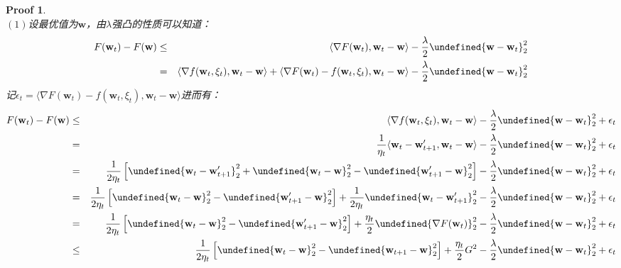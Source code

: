 \documentclass[a4paper,UTF8]{article}
\let\norm\undefined %
\DeclarePairedDelimiter\norm{\lVert}{\rVert}
\numberwithin{equation}{section}
\newtheorem*{myProof}{Proof}
\begin{document}
\begin{myProof}~\\
$(1)$设最优值为$\mathbf{w}$，由$\lambda$强凸的性质可以知道：
\begin{eqnarray*}
F(\mathbf{w}_t) - F(\mathbf{w}) &\le& \langle \nabla F(\mathbf{w}_t), \mathbf{w}_t - \mathbf{w} \rangle - \frac{\lambda}{2} \norm{\mathbf{w} - \mathbf{w}_t}_2^2 \\
&=& \langle \nabla f(\mathbf{w}_t, \xi_t), \mathbf{w}_t - \mathbf{w} \rangle + \langle \nabla F(\mathbf{w}_t) - f(\mathbf{w}_t, \xi_t) , \mathbf{w}_t - \mathbf{w} \rangle  - \frac{\lambda}{2} \norm{\mathbf{w} - \mathbf{w}_t}_2^2
\end{eqnarray*}
记$\epsilon_t = \langle \nabla F(\mathbf{w}_t) - f(\mathbf{w}_t, \xi_t) , \mathbf{w}_t - \mathbf{w} \rangle$进而有：
\begin{eqnarray*}
F(\mathbf{w}_t) - F(\mathbf{w})
&\le& \langle \nabla f(\mathbf{w}_t, \xi_t), \mathbf{w}_t - \mathbf{w} \rangle   - \frac{\lambda}{2} \norm{\mathbf{w} - \mathbf{w}_t}_2^2 + \epsilon_t \\
&=& \frac{1}{\eta_t} \langle \mathbf{w}_t - \mathbf{w}_{t+1}', \mathbf{w}_t - \mathbf{w} \rangle - \frac{\lambda}{2} \norm{\mathbf{w} - \mathbf{w}_t}_2^2 + \epsilon_t \\
&=& \frac{1}{2\eta_t} \left[ \norm{\mathbf{w}_t - \mathbf{w}_{t+1}'}_2^2 + \norm{\mathbf{w}_t - \mathbf{w}}_2^2 - \norm{\mathbf{w}_{t+1}' - \mathbf{w}}_2^2 \right] - \frac{\lambda}{2} \norm{\mathbf{w} - \mathbf{w}_t}_2^2 + \epsilon_t \\
&=& \frac{1}{2\eta_t} \left[ \norm{\mathbf{w}_t - \mathbf{w}}_2^2 - \norm{\mathbf{w}_{t+1}' - \mathbf{w}}_2^2 \right] + \frac{1}{2\eta_t} \norm{\mathbf{w}_t - \mathbf{w}_{t+1}'}_2^2 - \frac{\lambda}{2} \norm{\mathbf{w} - \mathbf{w}_t}_2^2 + \epsilon_t \\
&=& \frac{1}{2\eta_t} \left[ \norm{\mathbf{w}_t - \mathbf{w}}_2^2 - \norm{\mathbf{w}_{t+1}' - \mathbf{w}}_2^2 \right] + \frac{\eta_t}{2} \norm{\nabla F(\mathbf{w}_t)}_2^2 - \frac{\lambda}{2} \norm{\mathbf{w} - \mathbf{w}_t}_2^2 + \epsilon_t \\
&\le& \frac{1}{2\eta_t} \left[ \norm{\mathbf{w}_t - \mathbf{w}}_2^2 - \norm{\mathbf{w}_{t+1} - \mathbf{w}}_2^2 \right] + \frac{\eta_t}{2} G^2 - \frac{\lambda}{2} \norm{\mathbf{w} - \mathbf{w}_t}_2^2 + \epsilon_t
\end{eqnarray*}


\end{myProof}
\end{document}
